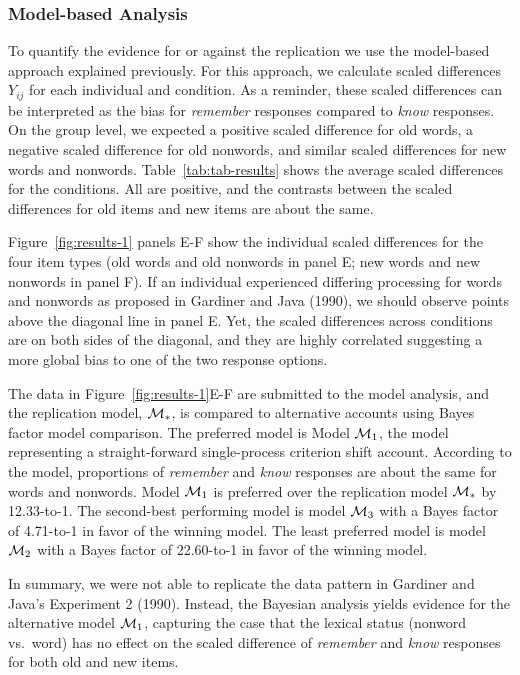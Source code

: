 \documentclass[english,,man,floatsintext]{apa6}
\begin{document}
\hypertarget{model-based-analysis}{%
\subsubsection{Model-based Analysis}\label{model-based-analysis}}

To quantify the evidence for or against the replication we use the model-based approach explained previously. For this approach, we calculate scaled differences \(Y_{ij}\) for each individual and condition. As a reminder, these scaled differences can be interpreted as the bias for \emph{remember} responses compared to \emph{know} responses. On the group level, we expected a positive scaled difference for old words, a negative scaled difference for old nonwords, and similar scaled differences for new words and nonwords. Table~\ref{tab:tab-results} shows the average scaled differences for the conditions. All are positive, and the contrasts between the scaled differences for old items and new items are about the same.

Figure~\ref{fig:results-1} panels E-F show the individual scaled differences for the four item types (old words and old nonwords in panel E; new words and new nonwords in panel F). If an individual experienced differing processing for words and nonwords as proposed in Gardiner and Java (1990), we should observe points above the diagonal line in panel E. Yet, the scaled differences across conditions are on both sides of the diagonal, and they are highly correlated suggesting a more global bias to one of the two response options.

The data in Figure~\ref{fig:results-1}E-F are submitted to the model analysis, and the replication model, \({\cal M}_{*}\), is compared to alternative accounts using Bayes factor model comparison. The preferred model is Model \({\cal M}_{1}\), the model representing a straight-forward single-process criterion shift account. According to the model, proportions of \emph{remember} and \emph{know} responses are about the same for words and nonwords. Model \({\cal M}_{1}\) is preferred over the replication model \({\cal M}_{*}\) by 12.33-to-1. The second-best performing model is model \({\cal M}_3\) with a Bayes factor of 4.71-to-1 in favor of the winning model. The least preferred model is model \({\cal M}_2\) with a Bayes factor of 22.60-to-1 in favor of the winning model.

In summary, we were not able to replicate the data pattern in Gardiner and Java's Experiment 2 (1990). Instead, the Bayesian analysis yields evidence for the alternative model \({\cal M}_1\), capturing the case that the lexical status (nonword vs.~word) has no effect on the scaled difference of \emph{remember} and \emph{know} responses for both old and new items.
\end{document}
